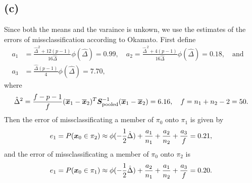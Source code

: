 \subsection*{(c)}
\label{sec:c-3}
Since both the means and the varaince is unkown, we use the estimates
of the errors of missclassification according to Okamato. First define 
\begin{align*}
  a_{1} &= \frac{\hat\Delta^{2} +
    12(p-1)}{16\hat\Delta}\phi(\hat\Delta) =0.99 ,  \quad a_{2} =
  \frac{\hat\Delta^{2} + 4(p-1)}{16\hat\Delta}\phi(\hat\Delta) =0.18 , \quad
  \text{and}\quad \\
  a_{3} &= \frac{\hat\Delta(p-1)}{4}\phi(\hat\Delta) = 7.70,
\end{align*}
where 
\begin{equation*}
  \hat\Delta^{2} = \frac{f - p - 1}{f} (\overline{\bm{x}}_{1} - \overline{\bm{x}}_{2})^{T}
  \bm{S}_{\rm pooled}^{-1} (\overline{\bm{x}}_{1} - \overline{\bm{x}}_{2}) = 6.16,
  \quad f = n_{1} + n_{2} - 2 = 50.
\end{equation*}
Then the error of missclassificating a member of $\pi_{0}$ onto 
$\pi_{1}$ is given by 
\begin{equation*}
  e_{1} = P(\bm{x}_{0} \in \pi_{2}) \approx  \phi(-\frac 12 \hat\Delta) + \frac{a_{1}}{n_{1}} +
  \frac{a_{2}}{n_{2}} + \frac{a_{3}}{f} = 0.21,  
\end{equation*}
and the error of missclassificating a member of $\pi_{0}$ onto 
$\pi_{2}$ is
\begin{equation*}
  e_{1} = P(\bm{x}_{0} \in \pi_{1}) \approx  \phi(-\frac 12 \hat\Delta) + \frac{a_{2}}{n_{1}} +
  \frac{a_{1}}{n_{2}} + \frac{a_{3}}{f} = 0.20.
\end{equation*}



\begin{comment}
  
  We could calculate the linear separators, $ l_i^T x_0 + c_i$, where
  we obtain
  \begin{align*}
    l_1^T x_0 + c_1 &= (-0.57, 1.80, 1.01, 6.33, 18.94, 0.33)x_0 + -703.95 \\ 
    l_2^T x_0 + c_2 &= (-0.14, 1.31, 1.48, 5.15, 18.31, 0.04)x_0 + -554.06 \\ 
    l_3^T x_0 + c_3 &= (-1.08, 1.89, 3.03, 5.69, 15.11, 0.51)x_0 + -618.43,
  \end{align*}
  In which we can conclude that ${\bf x_0}$ belongs to  $\pi_i$ if $
  l_i^T x_0 + c_i = \max_i \left(   l_i^T x_0 + c_i\right)
  $

\end{comment}
